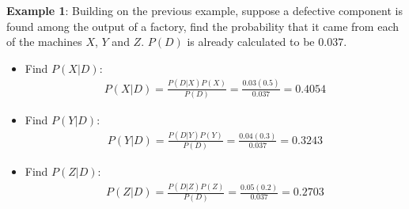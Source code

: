 \documentclass[10pt,a4paper]{article}
\begin{document}
\textbf{Example 1}: Building on the previous example, suppose a defective component is found among the output of a factory, find the
probability that it came from each of the machines $X$, $Y$ and $Z$. $P(D)$ is already calculated to
be $0.037$.
\begin{itemize}
    \item Find $P(X|D)$:
    \begin{align*}
        P(X|D) = \frac{P(D|X)P(X)}{P(D)} = \frac{0.03(0.5)}{0.037} = 0.4054
    \end{align*}

    \item Find $P(Y|D)$:
    \begin{align*}
        P(Y|D) = \frac{P(D|Y)P(Y)}{P(D)} = \frac{0.04(0.3)}{0.037} = 0.3243
    \end{align*}

    \item Find $P(Z|D)$:
    \begin{align*}
        P(Z|D) = \frac{P(D|Z)P(Z)}{P(D)} = \frac{0.05(0.2)}{0.037} = 0.2703
    \end{align*}
\end{itemize}

\end{document}
